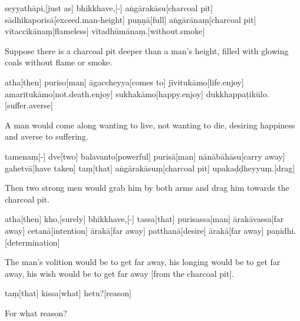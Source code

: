 \begin{samepage}
\begingl[glneveryline={\PaliGlossA,\PaliGlossB}]
seyyathāpi,[just as] bhikkhave,[-] aṅgārakāsu[charcoal pit] sādhikaporisā[exceed.man-height] puṇṇā[full] aṅgārānaṃ[charcoal pit] vītaccikānaṃ[flameless] vītadhūmānaṃ.[without.smoke]
\endgl
\nopagebreak
\linespread{0.5}
\begin{spacin}{0.2}
{\PaliGlossFT Suppose there is a charcoal pit deeper than a man’s height, filled with glowing coals without flame or smoke.}
\end{spacin}
\vskip 12pt
\end{samepage}
\begin{samepage}
\begingl[glneveryline={\PaliGlossA,\PaliGlossB}]
atha[then] puriso[man] āgaccheyya[comes to] jīvitukāmo[life.enjoy] amaritukāmo[not.death.enjoy] sukhakāmo[happy.enjoy] dukkhappaṭikūlo.[suffer.averse]
\endgl
\nopagebreak
\linespread{0.5}
\begin{spacin}{0.2}
{\PaliGlossFT A man would come along wanting to live, not wanting to die, desiring happiness and averse to suffering.}
\end{spacin}
\vskip 12pt
\end{samepage}
\begin{samepage}
\begingl[glneveryline={\PaliGlossA,\PaliGlossB}]
tamenaṃ[-] dve[two] balavanto[powerful] purisā[man] nānābāhāsu[carry away] gahetvā[have taken] taṃ[that] aṅgārakāsuṃ[charcoal pit] upakaḍḍheyyuṃ.[drag]
\endgl
\nopagebreak
\linespread{0.5}
\begin{spacin}{0.2}
{\PaliGlossFT Then two strong men would grab him by both arms and drag him towards the charcoal pit.}
\end{spacin}
\vskip 12pt
\end{samepage}
\begin{samepage}
\begingl[glneveryline={\PaliGlossA,\PaliGlossB}]
atha[then] kho,[surely] bhikkhave,[-] tassa[that] purisassa[man] ārakāvassa[far away] cetanā[intention] ārakā[far away] patthanā[desire] ārakā[far away] paṇidhi.[determination]
\endgl
\nopagebreak
\linespread{0.5}
\begin{spacin}{0.2}
{\PaliGlossFT The man’s volition would be to get far away, his longing would be to get far away, his wish would be to get far away [from the charcoal pit].}
\end{spacin}
\vskip 12pt
\end{samepage}
\begin{samepage}
\begingl[glneveryline={\PaliGlossA,\PaliGlossB}]
taṃ[that] kissa[what] hetu?[reason]
\endgl
\nopagebreak
\linespread{0.5}
\begin{spacin}{0.2}
{\PaliGlossFT For what reason?}
\end{spacin}
\vskip 12pt
\end{samepage}
